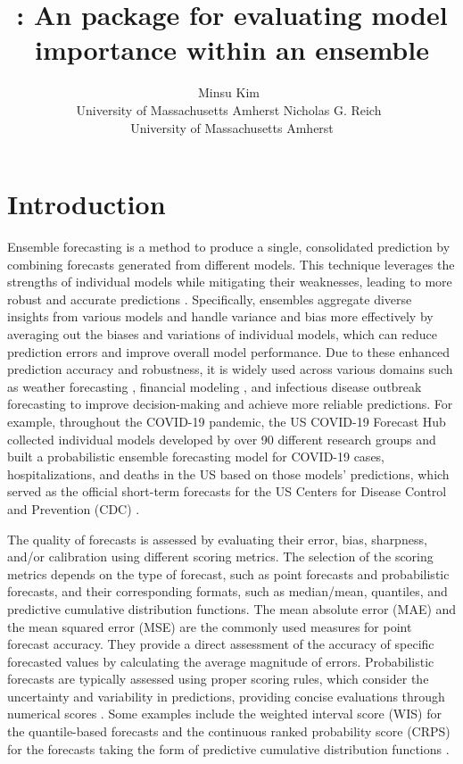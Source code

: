 \documentclass[
  article,
  shortnames,
  notitle]{jss}
\author{Minsu Kim~\orcidlink{0009-0008-4637-3589}\\University of
Massachusetts Amherst \And Nicholas G.
Reich~\orcidlink{0000-0003-3503-9899}\\University of Massachusetts
Amherst}
\title{\pkg{modelimportance}: An \proglang{R} package for evaluating
model importance within an ensemble}
\begin{document}
\maketitle


\section{Introduction}\label{sec-intro}

Ensemble forecasting is a method to produce a single, consolidated
prediction by combining forecasts generated from different models. This
technique leverages the strengths of individual models while mitigating
their weaknesses, leading to more robust and accurate predictions
\citep{gneiting2005weather, hastie01statisticallearning, lutz_applying_2019, viboud_rapidd_2018}.
Specifically, ensembles aggregate diverse insights from various models
and handle variance and bias more effectively by averaging out the
biases and variations of individual models, which can reduce prediction
errors and improve overall model performance. Due to these enhanced
prediction accuracy and robustness, it is widely used across various
domains such as weather forecasting
\citep{Guerra_2020, gneiting2005weather}, financial modeling
\citep{SUN2020101160, math11041054}, and infectious disease outbreak
forecasting \citep{ray_prediction_2018, reich_accuracy_2019} to improve
decision-making and achieve more reliable predictions. For example,
throughout the COVID-19 pandemic, the US COVID-19 Forecast Hub collected
individual models developed by over 90 different research groups and
built a probabilistic ensemble forecasting model for COVID-19 cases,
hospitalizations, and deaths in the US based on those models'
predictions, which served as the official short-term forecasts for the
US Centers for Disease Control and Prevention (CDC) \citep{kim2024}.

The quality of forecasts is assessed by evaluating their error, bias,
sharpness, and/or calibration using different scoring metrics. The
selection of the scoring metrics depends on the type of forecast, such
as point forecasts and probabilistic forecasts, and their corresponding
formats, such as median/mean, quantiles, and predictive cumulative
distribution functions. The mean absolute error (MAE) and the mean
squared error (MSE) are the commonly used measures for point forecast
accuracy. They provide a direct assessment of the accuracy of specific
forecasted values by calculating the average magnitude of errors.
Probabilistic forecasts are typically assessed using proper scoring
rules, which consider the uncertainty and variability in predictions,
providing concise evaluations through numerical scores
\citep{gneiting_strictly_2007}. Some examples include the weighted
interval score (WIS) for the quantile-based forecasts and the continuous
ranked probability score (CRPS) for the forecasts taking the form of
predictive cumulative distribution functions
\citep{bracher_evaluating_2021}.
\end{document}
